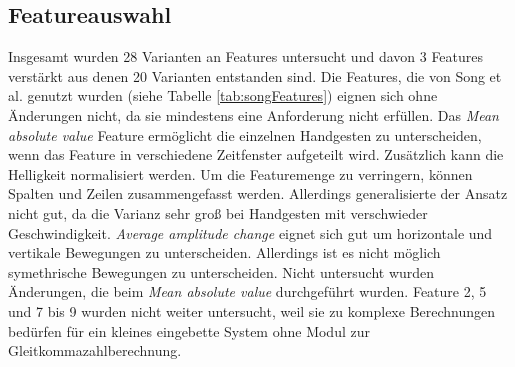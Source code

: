 \subsection{Featureauswahl}
\label{sec:feature_selection}
Insgesamt wurden 28 Varianten an Features untersucht und davon 3 Features verstärkt aus denen 20 Varianten entstanden sind. Die Features, die von Song et al. genutzt wurden
(siehe Tabelle \ref{tab:songFeatures}) eignen sich ohne Änderungen nicht, da sie mindestens eine Anforderung nicht erfüllen.
\newline
\newline
Das \textit{Mean absolute value} Feature ermöglicht die einzelnen Handgesten zu unterscheiden, wenn das Feature in verschiedene Zeitfenster aufgeteilt wird. Zusätzlich kann die Helligkeit normalisiert werden.
Um die Featuremenge zu verringern, können Spalten und Zeilen zusammengefasst werden. Allerdings generalisierte der Ansatz nicht gut, da die Varianz sehr groß bei Handgesten mit verschwieder Geschwindigkeit.
\newline
\newline
\textit{Average amplitude change} eignet sich gut um horizontale und vertikale Bewegungen zu unterscheiden. Allerdings ist es nicht möglich symethrische Bewegungen zu unterscheiden. Nicht untersucht wurden
Änderungen, die beim \textit{Mean absolute value} durchgeführt wurden.
\newline
\newline
Feature 2, 5 und 7 bis 9 wurden nicht weiter untersucht, weil sie zu komplexe Berechnungen bedürfen für ein kleines eingebette System ohne Modul zur Gleitkommazahlberechnung.

